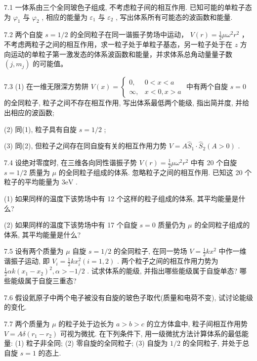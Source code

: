 7.1 一体系由三个全同玻色子组成, 不考虑粒子间的相互作用. 已知可能的单粒子态为 $\varphi_{1}$ 与 $\varphi_{2}$ , 相应的能量为 $\varepsilon_{1}$ 与 $\varepsilon_{2}$ , 写出体系所有可能态的波函数和能量.

\vfill\newpage

7.2 两个自旋 $s = 1 / 2$ 的全同粒子在同一谐振子势场中运动， $V(r) = \frac{1}{2}\mu \omega^2 r^2$ ，不考虑两粒子之间的相互作用，求一粒子处于单粒子基态，另一粒子处于在 $z$ 方向运动的单粒子第一激发态的体系波函数和能量，并求体系总角动量量子数 $(j, m_j)$ 的可能值。

\vfill\newpage

7.3 (1) 在一维无限深方势阱 $V(x) = \begin{cases} 0, & 0 < x < a \\ \infty, & x < 0, x > a \end{cases}$ 中有两个自旋 $s = 0$ 的全同粒子, 粒子之间不存在相互作用, 写出体系最低两个能级, 指出简并度, 并给出相应的波函数; 

(2) 同(1), 粒子具有自旋 $s = 1/2$ ; 

(3) 同(2), 但粒子之间存在同自旋有关的相互作用力势 $V = A\hat{S}_1 \cdot \hat{S}_2 (A > 0)$ .

\vfill\newpage

7.4 设绝对零度时, 在三维各向同性谐振子势 $V(r) = \frac{1}{2}\mu \omega^2 r^2$ 中有 20 个自旋 $s = 1 / 2$ 质量为 $\mu$ 的全同粒子组成的体系. 忽略粒子之间的相互作用. 已知这 20 个粒子的平均能量为 $3\mathrm{eV}$ . 

(1) 如果同样的温度下该势场中有 12 个这样的粒子组成的体系, 其平均能量是什么? 

(2) 如果同样的温度下该势场中有 17 个自旋 $s = 0$ 质量仍为 $\mu$ 的全同粒子组成的体系, 其平均能量是什么?

\vfill\newpage

7.5 设有两个质量为 $\mu$ 自旋 $s = 1 / 2$ 的全同粒子, 在同一势场 $V = \frac{1}{2} kx^{2}$ 中作一维谐振子运动, 即 $V_{i} = \frac{1}{2} kx_{i}^{2}(i = 1,2)$ . 两个粒子之间的相互作用力势为 $\frac{1}{2}\alpha k(x_{1} - x_{2})^{2}, \alpha > -1 / 2$ . 试求体系的能级, 并指出哪些能级属于自旋单态? 哪些能级属于自旋三重态?

\vfill\newpage

7.6 假设氦原子中两个电子被没有自旋的玻色子取代(质量和电荷不变), 试讨论能级的变化.

\vfill\newpage

7.7 两个质量为 $\mu$ 的粒子处于边长为 $a > b > c$ 的立方体盒中, 粒子间相互作用势 $V = A\delta(r_1 - r_2)$ 可视为微扰. 在下列条件下, 用一级微扰方法计算体系的最低能量: (1) 粒子非全同; (2) 零自旋的全同粒子; (3) 自旋为 $1/2$ 的全同粒子, 并处于总自旋 $s = 1$ 的态上.


